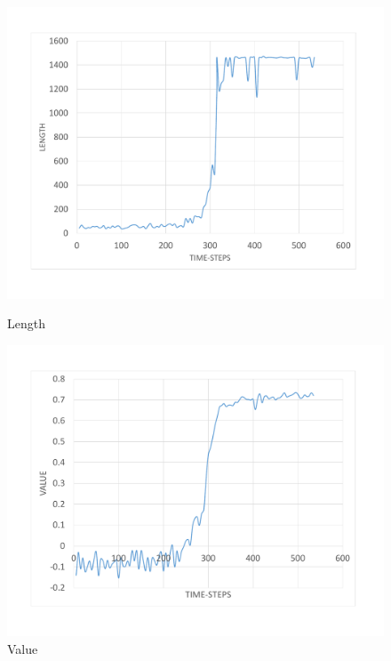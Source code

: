 \begin{figure}[H]
	\advance\leftskip-4cm
	\includegraphics[width=\linewidth]{Figures/Length}
	\caption{Length}\label{fig:Length}
	\endminipage\hfill
	\includegraphics[width=\textwidth]{Figures/Value}
	\caption{Value}
	\label{fig:Value}
	\endminipage
\end{figure}
